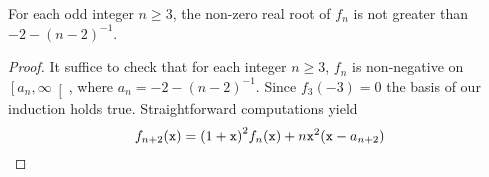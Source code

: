 \begin{theorem}
   For each odd integer $n \ge 3$,
   the non-zero real root of $f_n$ is not greater than $- 2 - {(n - 2)}^{- 1}$.
 \end{theorem}

 \begin{proof}
   It suffice to check that for each integer $n \ge 3$,
    $f_n$ is non-negative on $\left[a_n, \infty \right[$,
    where $a_n = - 2 - {(n - 2)}^{- 1}$.
    Since $f_3(- 3) = 0$ the basis of our induction holds true.
    Straightforward computations yield 
    $$
    f_{n + 2} (\mathtt{x}) = {(1 + \mathtt{x})}^2 f_n(\mathtt{x}) + n \mathtt{x}^2 (\mathtt{x} - a_{n + 2}) 
    $$
   
 \end{proof} 
 
 

